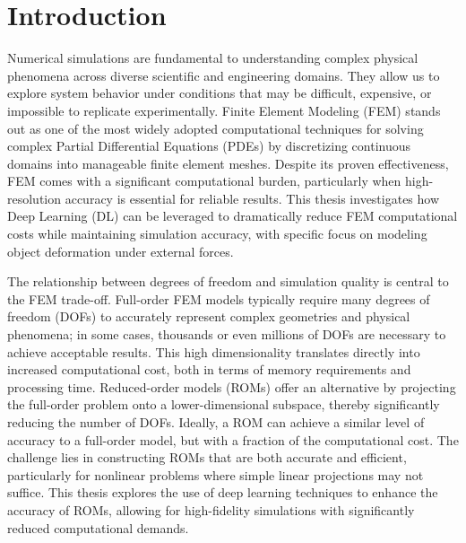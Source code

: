 

\section{Introduction}
Numerical simulations are fundamental to understanding complex physical phenomena across diverse scientific and engineering domains. They allow us to explore system behavior under conditions that may be difficult, expensive, or impossible to replicate experimentally. Finite Element Modeling (FEM) stands out as one of the most widely adopted computational techniques for solving complex Partial Differential Equations (PDEs) by discretizing continuous domains into manageable finite element meshes. Despite its proven effectiveness, FEM comes with a significant computational burden, particularly when high-resolution accuracy is essential for reliable results. This thesis investigates how Deep Learning (DL) can be leveraged to dramatically reduce FEM computational costs while maintaining simulation accuracy, with specific focus on modeling object deformation under external forces.


The relationship between degrees of freedom and simulation quality is central to the FEM trade-off. Full-order FEM models typically require many degrees of freedom (DOFs) to accurately represent complex geometries and physical phenomena; in some cases, thousands or even millions of DOFs are necessary to achieve acceptable results. This high dimensionality translates directly into increased computational cost, both in terms of memory requirements and processing time. Reduced-order models (ROMs) offer an alternative by projecting the full-order problem onto a lower-dimensional subspace, thereby significantly reducing the number of DOFs. Ideally, a ROM can achieve a similar level of accuracy to a full-order model, but with a fraction of the computational cost. The challenge lies in constructing ROMs that are both accurate and efficient, particularly for nonlinear problems where simple linear projections may not suffice. This thesis explores the use of deep learning techniques to enhance the accuracy of ROMs, allowing for high-fidelity simulations with significantly reduced computational demands.

